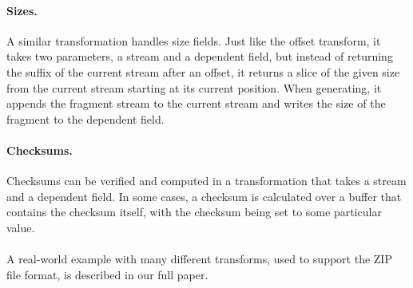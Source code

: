 \paragraph{Sizes.}
A similar transformation handles size fields. Just like the offset transform, it takes two parameters, a
stream and a dependent field, but instead of returning the suffix of the current stream after an
offset, it returns a slice of the given size from the current stream starting at its current
position. When generating, it appends the fragment stream to the current stream and writes the size
of the fragment to the dependent field.

\paragraph{Checksums.}
Checksums can be verified and computed in a transformation that takes a stream and a dependent
field. In some cases, a checksum is calculated over a buffer that contains the checksum itself, with
the checksum being set to some particular value. 

\paragraph{}
A real-world example with many different transforms, used to support
the ZIP file format, is described in our full paper.%







